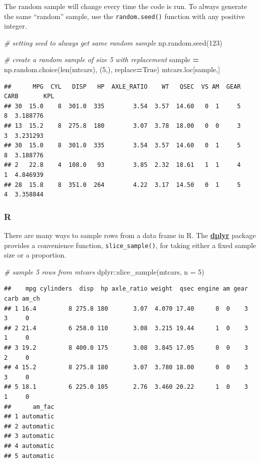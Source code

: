 \documentclass[
]{book}
\newenvironment{Shaded}{\begin{snugshade}}{\end{snugshade}}
\newcommand{\AttributeTok}[1]{\textcolor[rgb]{0.77,0.63,0.00}{#1}}
\newcommand{\BuiltInTok}[1]{#1}
\newcommand{\CommentTok}[1]{\textcolor[rgb]{0.56,0.35,0.01}{\textit{#1}}}
\newcommand{\DecValTok}[1]{\textcolor[rgb]{0.00,0.00,0.81}{#1}}
\newcommand{\FunctionTok}[1]{\textcolor[rgb]{0.00,0.00,0.00}{#1}}
\newcommand{\NormalTok}[1]{#1}
\newcommand{\OperatorTok}[1]{\textcolor[rgb]{0.81,0.36,0.00}{\textbf{#1}}}
\newcommand{\SpecialCharTok}[1]{\textcolor[rgb]{0.00,0.00,0.00}{#1}}
\newcommand{\VariableTok}[1]{\textcolor[rgb]{0.00,0.00,0.00}{#1}}
\begin{document}
The random sample will change every time the code is run. To always generate the same ``random'' sample, use the \texttt{random.seed()} function with any positive integer.

\begin{Shaded}
\begin{Highlighting}[]
\CommentTok{\# setting seed to always get same random sample}
\NormalTok{np.random.seed(}\DecValTok{123}\NormalTok{)}

\CommentTok{\# create a random sample of size 5 with replacement}
\NormalTok{sample }\OperatorTok{=}\NormalTok{ np.random.choice(}\BuiltInTok{len}\NormalTok{(mtcars), (}\DecValTok{5}\NormalTok{,), replace}\OperatorTok{=}\VariableTok{True}\NormalTok{)}
\NormalTok{mtcars.loc[sample,]}
\end{Highlighting}
\end{Shaded}

\begin{verbatim}
##      MPG  CYL   DISP   HP  AXLE_RATIO    WT   QSEC  VS AM  GEAR  CARB       KPL
## 30  15.0    8  301.0  335        3.54  3.57  14.60   0  1     5     8  3.188776
## 13  15.2    8  275.8  180        3.07  3.78  18.00   0  0     3     3  3.231293
## 30  15.0    8  301.0  335        3.54  3.57  14.60   0  1     5     8  3.188776
## 2   22.8    4  108.0   93        3.85  2.32  18.61   1  1     4     1  4.846939
## 28  15.8    8  351.0  264        4.22  3.17  14.50   0  1     5     4  3.358844
\end{verbatim}

\hypertarget{r-29}{%
\subsubsection*{R}\label{r-29}}

There are many ways to sample rows from a data frame in R. The \href{https://dplyr.tidyverse.org/}{\textbf{dplyr}} package provides a convenience function, \texttt{slice\_sample()}, for taking either a fixed sample size or a proportion.

\begin{Shaded}
\begin{Highlighting}[]
\CommentTok{\# sample 5 rows from mtcars}
\NormalTok{dplyr}\SpecialCharTok{::}\FunctionTok{slice\_sample}\NormalTok{(mtcars, }\AttributeTok{n =} \DecValTok{5}\NormalTok{)}
\end{Highlighting}
\end{Shaded}

\begin{verbatim}
##    mpg cylinders  disp  hp axle_ratio weight  qsec engine am gear carb am_ch
## 1 16.4         8 275.8 180       3.07  4.070 17.40      0  0    3    3     0
## 2 21.4         6 258.0 110       3.08  3.215 19.44      1  0    3    1     0
## 3 19.2         8 400.0 175       3.08  3.845 17.05      0  0    3    2     0
## 4 15.2         8 275.8 180       3.07  3.780 18.00      0  0    3    3     0
## 5 18.1         6 225.0 105       2.76  3.460 20.22      1  0    3    1     0
##      am_fac
## 1 automatic
## 2 automatic
## 3 automatic
## 4 automatic
## 5 automatic
\end{verbatim}
\end{document}
